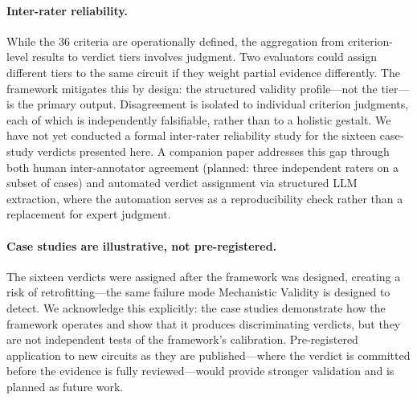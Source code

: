 \documentclass{article}
\begin{document}
\paragraph{Inter-rater reliability.} While the 36 criteria are operationally defined, the aggregation from criterion-level results to verdict tiers involves judgment. Two evaluators could assign different tiers to the same circuit if they weight partial evidence differently. The framework mitigates this by design: the structured validity profile---not the tier---is the primary output. Disagreement is isolated to individual criterion judgments, each of which is independently falsifiable, rather than to a holistic gestalt. We have not yet conducted a formal inter-rater reliability study for the sixteen case-study verdicts presented here. A companion paper addresses this gap through both human inter-annotator agreement (planned: three independent raters on a subset of cases) and automated verdict assignment via structured LLM extraction, where the automation serves as a reproducibility check rather than a replacement for expert judgment.

\paragraph{Case studies are illustrative, not pre-registered.} The sixteen verdicts were assigned after the framework was designed, creating a risk of retrofitting---the same failure mode Mechanistic Validity is designed to detect. We acknowledge this explicitly: the case studies demonstrate how the framework operates and show that it produces discriminating verdicts, but they are not independent tests of the framework's calibration. Pre-registered application to new circuits as they are published---where the verdict is committed before the evidence is fully reviewed---would provide stronger validation and is planned as future work.
\end{document}
